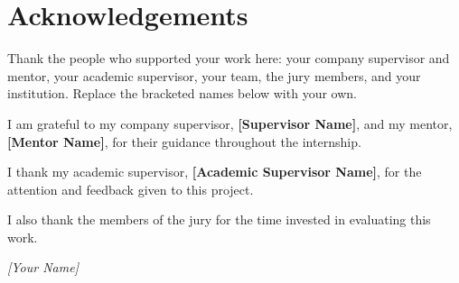 \chapter*{Acknowledgements}
\thispagestyle{plain}

Thank the people who supported your work here: your company supervisor and
mentor, your academic supervisor, your team, the jury members, and your
institution. Replace the bracketed names below with your own.

I am grateful to my company supervisor, \textbf{[Supervisor Name]}, and my
mentor, \textbf{[Mentor Name]}, for their guidance throughout the internship.

I thank my academic supervisor, \textbf{[Academic Supervisor Name]}, for the
attention and feedback given to this project.

I also thank the members of the jury for the time invested in evaluating
this work.

\vspace{1em}
\noindent\hfill\emph{[Your Name]}

\newpage
